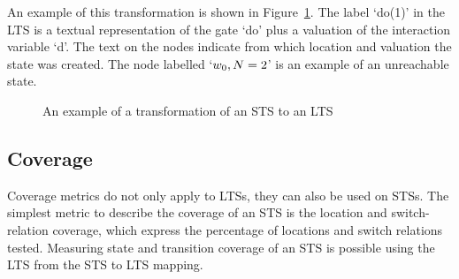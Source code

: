 An example of this transformation is shown in Figure~\ref{fig:example_trafo}. The label `do(1)' in the LTS is a textual representation of the gate `do' plus a valuation of the interaction variable `d'. The text on the nodes indicate from which location and valuation the state was created. The node labelled `$w_0, N=2$' is an example of an unreachable state.  %

\begin{figure}[ht]
  \begin{center}
    \hspace{20px}
  \end{center}
  \caption{An example of a transformation of an STS to an LTS}
  \label{fig:example_trafo}
\end{figure}

\subsection{Coverage}\label{sec:sts_coverage}
Coverage metrics do not only apply to LTSs, they can also be used on STSs. The simplest metric to describe the coverage of an STS is the location and switch-relation coverage, which express the percentage of locations and switch relations tested. Measuring state and transition coverage of an STS is possible using the LTS from the STS to LTS mapping. 

